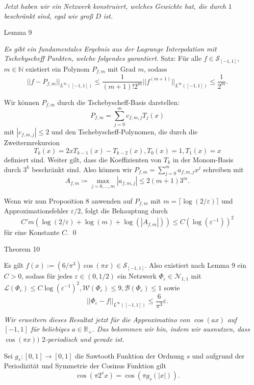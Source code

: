 \documentclass[12pt]{article}
\newcommand{\N}{\mathbb{N}} %
\newcommand{\R}{\mathbb{R}} %
\begin{document}
\textit{Jetzt haben wir ein Netzwerk konstruiert, welches Gewichte hat, die durch \(1\) 
beschränkt sind, egal wie groß \(D\) ist.}

\newpage

{\Large Lemma 9} %

\textit{Es gibt ein fundamentales Ergebnis aus der Lagrange Interpolation mit 
Tschebyscheff Punkten, welche folgendes garantiert.}
Satz: 
Für alle \(f\in \mathcal{S}_{[-1,1]}\), \(m\in\N\) existiert ein Polynom 
\(P_{f,m}\) mit Grad \(m\), sodass 
\[ ||f - P_{f,m}||_{L^\infty ([-1,1])} \leq \frac{1}{(m+1)!2^m} ||f^{(m+1)}||_{L^\infty ([-1,1])} \leq \frac{1}{2^m}. \]

Wir können \(P_{f,m}\) durch die Tschebyscheff-Basis darstellen: 
\[ P_{f,m} = \sum_{j=0}^m c_{f,m,j} T_j(x) \]
mit \(|c_{f,m,j}| \leq 2\) 
und den Tschebyscheff-Polynomen, die durch die Zweitermrekursion 
\[ T_k(x) = 2x T_{k-1}(x) - T_{k-2}(x), T_0(x) = 1, T_1(x) = x \]
definiert sind.
Weiter gilt, dass die Koeffizienten von \(T_k\) in der Monom-Basis 
durch \(3^k\) beschränkt sind. 
Also können wir \(P_{f,m} = \sum_{j=0}^m a_{f,m,j} x^j\) schreiben mit 
\[ A_{f,m} \coloneqq \max_{j=0,\ldots, m} |a_{f,m,j}| \leq 2(m+1)3^m. \] 

Wenn wir nun Proposition 8 anwenden auf \(P_{f,m}\) mit \(m= \lceil \log(2/\varepsilon)\rceil\) 
und Approximationsfehler \(\varepsilon/2\), folgt die Behauptung durch
\[ C' m(\log(2/\varepsilon) + \log(m) + \log(|A_{f,m}|)) \leq C (\log(\varepsilon^{-1}))^2 \]
für eine Konstante \(C\). \qed

\newpage

{\Large Theorem 10} %

Es gilt \(f(x) := (6/\pi^3) \cos(\pi x) \in \mathcal{S}_{[-1,1]}\). Also existiert nach Lemma 9 
ein \(C>0\), sodass für jedes \(\varepsilon \in (0,1/2)\) ein Netzwerk \(\Phi_\varepsilon \in \mathcal{N}_{1,1}\) 
mit \(\mathcal{L}(\Phi_\varepsilon) \leq C \log(\varepsilon^{-1})^2, \mathcal{W}(\Phi_\varepsilon) \leq 9, 
\mathcal{B}(\Phi_\varepsilon) \leq 1\) sowie 
\[ ||\Phi_\varepsilon - f ||_{L^{\infty}([-1,1])} \leq \frac{6}{\pi^3} \varepsilon. \tag{\(*\)} \]

\textit{Wir erweitern dieses Resultat jetzt für die Approximatino von \(\cos(ax)\) auf \([-1,1]\) für beliebiges \(a\in \R_+\). 
Das bekommen wir hin, indem wir ausnutzen, dass \(\cos(\pi x))\) \(2\)-periodisch und gerade ist.}

Sei \(g_s:[0,1] \rightarrow [0,1]\) die Sawtooth Funktion der Ordnung \(s\) und aufgrund der Periodizität und Symmetrie der Cosinus Funktion gilt 
\[ \cos(\pi 2^s x) = \cos(\pi g_s(|x|)). \]
\end{document}
